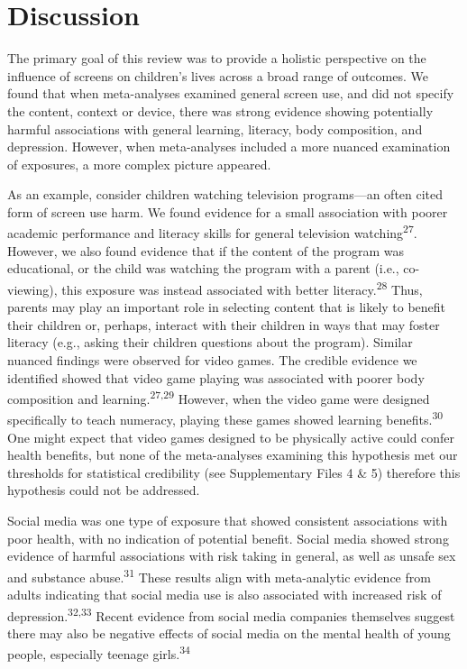 \documentclass[
  english,
  man]{apa6}
\begin{document}
\hypertarget{discussion}{%
\section{Discussion}\label{discussion}}

The primary goal of this review was to provide a holistic perspective on the influence of screens on children's lives across a broad range of outcomes.
We found that when meta-analyses examined general screen use, and did not specify the content, context or device, there was strong evidence showing potentially harmful associations with general learning, literacy, body composition, and depression.
However, when meta-analyses included a more nuanced examination of exposures, a more complex picture appeared.

As an example, consider children watching television programs---an often cited form of screen use harm.
We found evidence for a small association with poorer academic performance and literacy skills for general television watching\textsuperscript{27}.
However, we also found evidence that if the content of the program was educational, or the child was watching the program with a parent (i.e., co-viewing), this exposure was instead associated with better literacy.\textsuperscript{28}
Thus, parents may play an important role in selecting content that is likely to benefit their children or, perhaps, interact with their children in ways that may foster literacy (e.g., asking their children questions about the program).
Similar nuanced findings were observed for video games.
The credible evidence we identified showed that video game playing was associated with poorer body composition and learning.\textsuperscript{27,29}
However, when the video game were designed specifically to teach numeracy, playing these games showed learning benefits.\textsuperscript{30}
One might expect that video games designed to be physically active could confer health benefits, but none of the meta-analyses examining this hypothesis met our thresholds for statistical credibility (see Supplementary Files 4 \& 5) therefore this hypothesis could not be addressed.

Social media was one type of exposure that showed consistent associations with poor health, with no indication of potential benefit.
Social media showed strong evidence of harmful associations with risk taking in general, as well as unsafe sex and substance abuse.\textsuperscript{31}
These results align with meta-analytic evidence from adults indicating that social media use is also associated with increased risk of depression.\textsuperscript{32,33}
Recent evidence from social media companies themselves suggest there may also be negative effects of social media on the mental health of young people, especially teenage girls.\textsuperscript{34}
\end{document}
